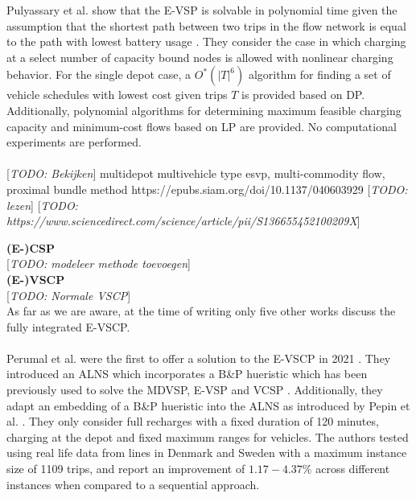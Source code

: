 \documentclass[ht]{article}
\newcommand{\todo}[1]{{\color{red}[\textit{TODO: #1}]}}
\begin{document}
Pulyassary et al. show that the E-VSP is solvable in polynomial time given the
assumption that the shortest path between two trips in the flow network is
equal to the path with lowest battery usage \cite{Pulyassary2024}. They
consider the case in which charging at a select number of capacity bound nodes
is allowed with nonlinear charging behavior. For the single depot case, a
$O^*(|T|^6)$ algorithm for finding a set of vehicle schedules with lowest cost
given trips $T$ is provided based on DP. Additionally, polynomial algorithms
for determining maximum feasible charging capacity and minimum-cost flows based
on LP are provided. No computational experiments are performed. \\\\

\todo{Bekijken} multidepot multivehicle type esvp, multi-commodity flow, proximal bundle method https://epubs.siam.org/doi/10.1137/040603929 \todo{lezen}\cite{Borndörfer2024}
\todo{https://www.sciencedirect.com/science/article/pii/S136655452100209X}

\noindent \textbf{(E-)CSP}\\
\todo{modeleer methode toevoegen}\\

\noindent \textbf{(E-)VSCP}\\
\todo{Normale VSCP}\\
As far as we are aware, at the time of writing only five other works discuss the fully integrated E-VSCP. \\\\

Perumal et al. were the first to offer a solution to the E-VSCP in 2021
\cite{Perumal2021}. They introduced an ALNS which incorporates a B\&P hueristic
which has been previously used to solve the MDVSP, E-VSP and VCSP
\cite{Pepin2009, Haase1996, vanKootenNiekerk2017}. Additionally, they adapt an
embedding of a B\&P hueristic into the ALNS as introduced by Pepin et al.
\cite{Pepin2009}. They only consider full recharges with a fixed duration of
120 minutes, charging at the depot and fixed maximum ranges for vehicles. The
authors tested using real life data from lines in Denmark and Sweden with a
maximum instance size of 1109 trips, and report an improvement of $1.17-4.37\%$
across different instances when compared to a sequential approach. \\\\
\end{document}
